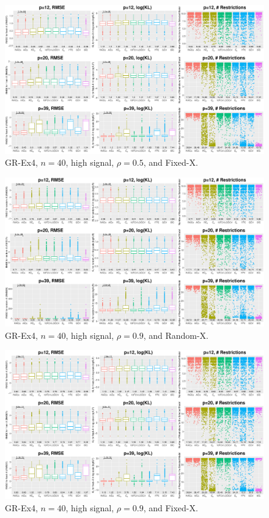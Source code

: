 \begin{figure}[!ht]
\centering
\includegraphics[width=\textwidth]{figures/supplement/fixedx_GR-Ex4_n40_hsnr_rho05.eps}
\caption{GR-Ex4, $n=40$, high signal, $\rho=0.5$, and Fixed-X.}
\end{figure}
\clearpage
\begin{figure}[!ht]
\centering
\includegraphics[width=\textwidth]{figures/supplement/randomx_GR-Ex4_n40_hsnr_rho09.eps}
\caption{GR-Ex4, $n=40$, high signal, $\rho=0.9$, and Random-X.}
\end{figure}
\begin{figure}[!ht]
\centering
\includegraphics[width=\textwidth]{figures/supplement/fixedx_GR-Ex4_n40_hsnr_rho09.eps}
\caption{GR-Ex4, $n=40$, high signal, $\rho=0.9$, and Fixed-X.}
\end{figure}
